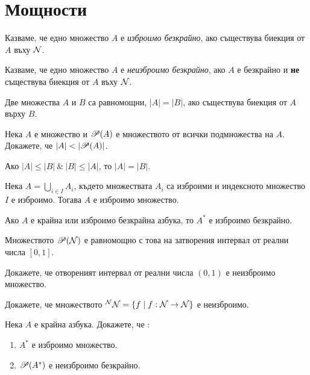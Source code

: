 
\section{Мощности}


Казваме, че едно множество $A$ е {\em изброимо безкрайно}, ако съществува 
биекция от $A$ въху $\mathcal{N}$.

Казваме, че едно множество $A$ е {\em неизброимо безкрайно}, ако $A$ е безкрайно и {\bf не} съществува 
биекция от $A$ въху $\mathcal{N}$.

\begin{dfn}
  Две множества $A$ и $B$ са равномощни, $|A| = |B|$, ако съществува биекция от $A$ върху $B$.
\end{dfn}

\begin{thm}
  Нека $A$ е множество и $\mathscr{P}(A)$ е множеството от всички подмножества на $A$.
  Докажете, че $|A| < |\mathscr{P}(A)|$.
\end{thm}


\begin{thm}\label{KSB}
  Ако $|A|\leq|B|\ \&\ |B|\leq|A|$, то $|A| = |B|$.
\end{thm}

\begin{thm}\label{countable_union}
  Нека $A = \bigcup_{i\in I}A_i$, където множествата $A_i$ са изброими и индексното множество $I$ е изброимо.
  Тогава $A$ е изброимо множество.
\end{thm}
\begin{crl}
  Ако $A$ е крайна или изброимо безкрайна азбука, то $A^*$ е изброимо безкрайно.
\end{crl}

\begin{problem}
  Множеството $\mathscr{P}(\mathcal{N})$ е равномощно с това на затворения интервал от реални числа $[0,1]$.
\end{problem}

\begin{problem}
  Докажете, че отвореният интервал от реални числа $(0,1)$ е неизброимо множество.
\end{problem}

\begin{problem}
  Докажете, че множеството $^{\mathcal{N}}\mathcal{N} = \{f\mid f:\mathcal{N}\to\mathcal{N}\}$ е неизброимо.
\end{problem}

\begin{problem}
  Нека $A$ е крайна азбука.
  Докажете, че :
  \begin{enumerate}[1)]
  \item
    $A^*$ е изброимо множество.
  \item
    $\mathscr{P}(A^*)$ е неизброимо безкрайно.
  \end{enumerate}
\end{problem}

